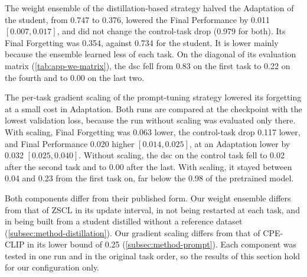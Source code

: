 The weight ensemble of the distillation-based strategy halved the Adaptation of the student, from 0.747 to 0.376, lowered the Final Performance by 0.011 $[0.007, 0.017]$, and did not change the control-task drop (0.979 for both).
Its Final Forgetting was 0.354, against 0.734 for the student.
It is lower mainly because the ensemble learned less of each task.
On the diagonal of its evaluation matrix (\cref{tab:app-we-matrix}), the \gls{dsc} fell from 0.83 on the first task to 0.22 on the fourth and to 0.00 on the last two.

{\captionsetup{list=no}}

The per-task gradient scaling of the prompt-tuning strategy lowered its forgetting at a small cost in Adaptation.
Both runs are compared at the checkpoint with the lowest validation loss, because the run without scaling was evaluated only there.
With scaling, Final Forgetting was 0.063 lower, the control-task drop 0.117 lower, and Final Performance 0.020 higher $[0.014, 0.025]$, at an Adaptation lower by 0.032 $[0.025, 0.040]$.
Without scaling, the \gls{dsc} on the control task fell to 0.02 after the second task and to 0.00 after the last.
With scaling, it stayed between 0.04 and 0.23 from the first task on, far below the 0.98 of the pretrained model.

Both components differ from their published form.
Our weight ensemble differs from that of ZSCL in its update interval, in not being restarted at each task, and in being built from a student distilled without a reference dataset (\cref{subsec:method-distillation}).
Our gradient scaling differs from that of CPE-CLIP in its lower bound of 0.25 (\cref{subsec:method-prompt}).
Each component was tested in one run and in the original task order, so the results of this section hold for our configuration only.

